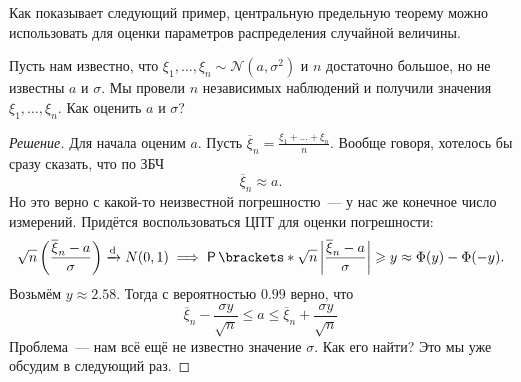 Как показывает следующий пример, центральную предельную теорему можно использовать для оценки параметров распределения случайной величины.
\begin{example}
	Пусть нам известно, что \(\xi_{1}, \dots, \xi_{n} \sim \mathcal{N}(a, \sigma^2)\) и \(n\) достаточно большое, но не известны \(a\) и \(\sigma\). Мы провели \(n\) независимых наблюдений и получили значения \(\xi_{1}, \dots, \xi_{n}\). Как оценить \(a\) и \(\sigma\)?
\end{example}
\begin{proof}[Решение]
	Для начала оценим \(a\). Пусть \(\overline{\xi}_n = \frac{\xi_{1} + \dots + \xi_{n}}{n}\). Вообще говоря, хотелось бы сразу сказать, что по ЗБЧ
	\[
		\overline{\xi}_n \approx a.
	\]
	Но это верно с какой-то неизвестной погрешностю~--- у нас же конечное число измерений. Придётся воспользоваться ЦПТ для оценки погрешности:
	\[
		\sqrt{n}\left(\frac{\overline{\xi}_n - a}{\sigma}\right) \dto N(0, 1) \implies \Pr{\sqrt{n}\left|\frac{\overline{\xi}_n - a}{\sigma}\right| \geq y} \approx \Phi(y) - \Phi(-y).
	\]
	Возьмём \(y \approx 2.58\). Тогда с вероятностью \(0.99\) верно, что
	\[
		\overline{\xi}_n - \frac{\sigma y}{\sqrt{n}} \leq a \leq \overline{\xi}_n + \frac{\sigma y}{\sqrt{n}}
	\]
	Проблема~--- нам всё ещё не известно значение \(\sigma\). Как его найти? Это мы уже обсудим в следующий раз.
\end{proof}